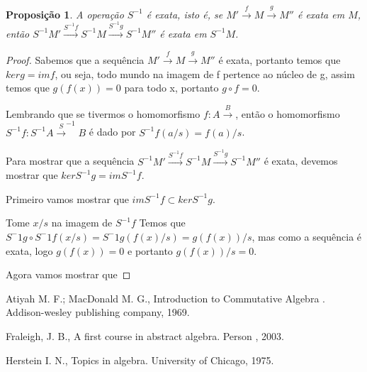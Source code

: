 \documentclass[10pt,a4paper]{article}
\newtheorem{proposition}[theorem]{Proposição}
\begin{document}
\begin{proposition}
	A operação $S^{-1}$ é exata, isto é, se $M' \xrightarrow{f} M \xrightarrow{g}  M''$ é exata em $M$, então $S^{-1}M' \xrightarrow{S^{-1}f} S^{-1}M \xrightarrow{S^{-1}g}  S^{-1}M''$ é exata em $S^{-1}M$.
\end{proposition}
\begin{proof}
	Sabemos que a sequência $M' \xrightarrow{f} M \xrightarrow{g}  M''$ é exata, portanto temos que $ker g = im f$, ou seja, todo mundo na imagem de f pertence ao núcleo de g, assim temos que $g(f(x))=0$ para todo x, portanto $g \circ f = 0$.
	
	Lembrando que se tivermos o homomorfismo $f:A \xrightarrow B$, então o homomorfismo $S^{-1}f:S^{-1}A \xrightarrow S^{-1}B$ é dado por $S^{-1}f(a/s)=f(a)/s$.
	
	Para mostrar que a sequência $S^{-1}M' \xrightarrow{S^{-1}f} S^{-1}M \xrightarrow{S^{-1}g}  S^{-1}M''$ é exata, devemos mostrar que $ker S^{-1}g = im S^{-1}f$.
	
	Primeiro vamos mostrar que $im S^{-1}f \subset ker S^{-1}g$.
	
	Tome $x/s$ na imagem de $S^{-1}f$
	Temos que $S^-1g \circ S^-1f(x/s)=S^-1g(f(x)/s)=g(f(x))/s$, mas como a sequência é exata, logo $g(f(x))=0$ e portanto $g(f(x))/s=0$.
	
	Agora vamos mostrar que 
	
	
\end{proof}




\newpage

\begin{thebibliography}{20}
	
	  Atiyah M. F.; MacDonald M. G., Introduction to Commutative Algebra . Addison-wesley publishing company, 1969.
	
	  Fraleigh, J. B., A first course in abstract algebra. Person , 2003.
	
	 Herstein I. N., Topics in algebra. University of Chicago, 1975.	
	
\end{thebibliography}
\end{document}
